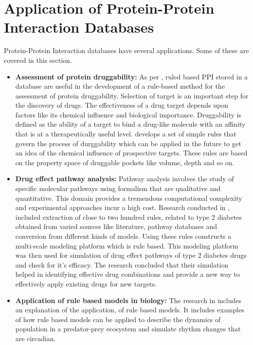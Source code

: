 \documentclass[msc,deptreport,ai]{infthesis}      %
\begin{document}
\section{Application of Protein-Protein Interaction Databases}
Protein-Protein Interaction databases have several applications. Some of these are covered in this section.
\begin{itemize}
\item
\textbf{Assessment of protein druggability:} As per \cite{druggability}, ruled based PPI stored in a database are useful in the development of a rule-based method for the assessment of protein druggability. Selection of target is an important step for the discovery of drugs. The effectiveness of a drug target depends upon factors like  its chemical influence and biological importance. Druggability is defined as the ability of a target to bind a drug-like molecule with an affinity that is at a therapeutically useful level. \cite{druggability} develops a set of simple rules that govern the process of durggability which can be applied in the future to get an idea of the chemical influence of prospective targets. These rules are based on the property space of druggable pockets like volume, depth and so on.
\item 
\textbf{Drug effect pathway analysis:} Pathway analysis involves the study of specific molecular pathways using formalism that are qualitative and quantitative. This domain provides a tremendous computational complexity and experimental approaches incur a high cost. Research conducted in \cite{ruleMultiscale}, included extraction of close to two hundred rules, related to type 2 diabetes obtained from varied sources like literature, pathway databases and conversion from different kinds of models. Using these rules \cite{ruleMultiscale} constructs a multi-scale modeling platform which is rule based. This modeling platform was then used for simulation of drug effect pathways of type 2 diabetes drugs and check for it's efficacy. The research concluded that their simulation helped in identifying effective drug combinations and provide a new way to effectively apply existing drugs for new targets.
\item
\textbf{Application of rule based models in biology:} The research in \cite{rule_based} includes an explanation of the application, of rule based models. It includes examples of how rule based models can be applied to describe the dynamics of population in a predator-prey ecosystem and simulate rhythm changes that are circadian. 
\end{itemize}
\end{document}
